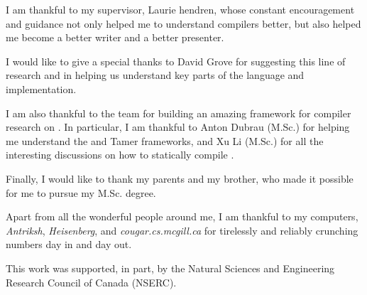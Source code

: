 I am thankful to my supervisor, Laurie hendren, whose constant encouragement and
guidance not only helped me to understand compilers better, but also helped me
become a better writer and a better presenter.

I would like to give a special thanks to David Grove for suggesting this line of
research and in helping us understand key parts of the \xten language and
implementation.

I am also thankful to the \mclab team for building an amazing framework for
compiler research on \matlab. In particular, I am thankful to Anton Dubrau
(M.Sc.) for helping me understand the \mcsaf and Tamer frameworks, and Xu Li
(M.Sc.) for all the interesting discussions on how to statically compile
\matlab.

Finally, I would like to thank my parents and my brother, who made it possible
for me to pursue my M.Sc. degree.

Apart from all the wonderful people around me, I am thankful to my computers,
\emph{Antriksh}, \emph{Heisenberg}, and \emph{cougar.cs.mcgill.ca} for
tirelessly and reliably crunching numbers day in and day out.

This work was supported, in part, by the Natural Sciences and Engineering
Research Council of Canada (NSERC).   

